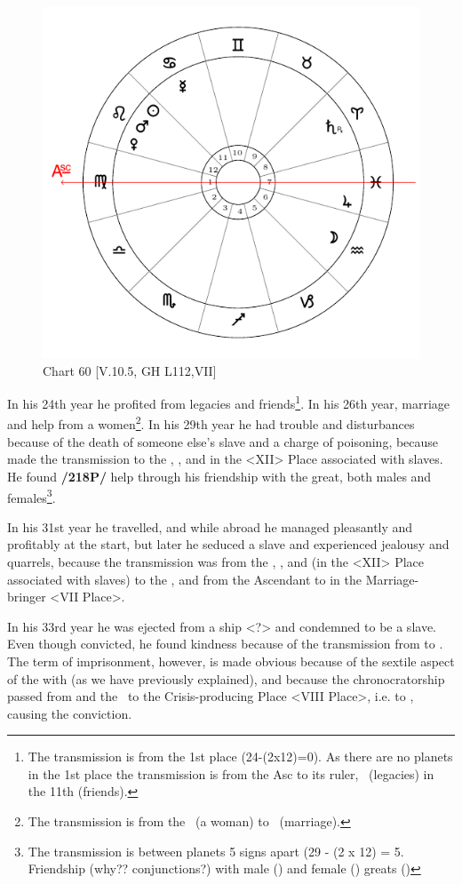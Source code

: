 \begin{figure}
\centering
\vspace{-20pt}
\includegraphics[width=.68\textwidth]{charts/5_10_05}
\caption{Chart 60 [V.10.5, GH L112,VII]}
\label{fig:chart60}
\end{figure}


In his 24th year he profited from legacies and friends\footnote{The transmission is from the 1st place (24-(2x12)=0). As there are no planets in the 1st place the transmission is from the Asc to its ruler, \Mercury\, (legacies) in the 11th (friends).}. In his 26th
year, marriage and help from a women\footnote{The transmission is from the \Moon\, (a woman) to \Jupiter\, (marriage).}. In his 29th year he had trouble and disturbances because of the death of someone else’s slave and a charge of poisoning, because \Saturn\xspace made the transmission to the \Sun, \Mars, and \Venus\xspace in the <XII> Place associated with slaves. He found \textbf{/218P/} help through his friendship with the great, both males and females\footnote{The transmission is between planets 5 signs apart (29 - (2 x 12) = 5. Friendship (why?? conjunctions?) with male (\Mars) and female (\Venus) greats (\Sun)}. 

In his 31st year he travelled, and while abroad he managed pleasantly and profitably at the start, but later he seduced a slave and experienced jealousy and quarrels, because the transmission was from the \Sun, \Venus, and \Mars (in the <XII> Place associated with slaves) to the \Moon, and from the Ascendant to \Jupiter\xspace in the Marriage-bringer <VII Place>. 

In his 33rd year he was ejected from a ship <?> and condemned to be a slave. Even though convicted, he found kindness because
of the transmission from \Mercury\xspace to \Jupiter. The term of imprisonment, however, is made obvious because of the sextile aspect of the \Moon\xspace with \Saturn\xspace (as we have previously explained), and because the chronocratorship passed from \Mars\xspace and the \Sun\, to the Crisis-producing Place <VIII Place>, i.e. to \Saturn, causing the conviction. 

